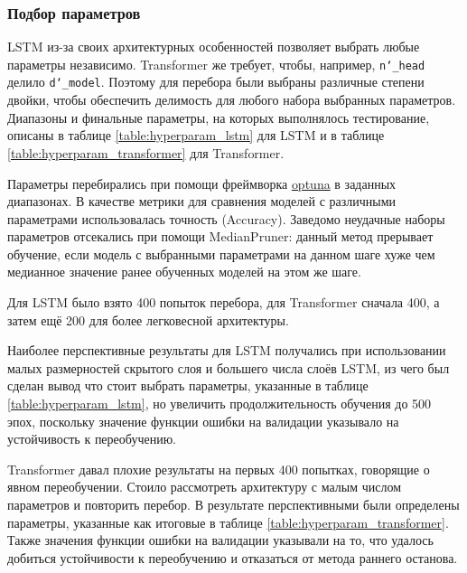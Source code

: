 \documentclass[diploma]{nanolab2015}
\begin{document}
\subsubsection{Подбор параметров}
LSTM из-за своих архитектурных особенностей позволяет выбрать любые параметры независимо. Transformer же требует, чтобы, например, \texttt{n\char`_head} делило \texttt{d\char`_model}. Поэтому для перебора были выбраны различные степени двойки, чтобы обеспечить делимость для любого набора выбранных параметров. Диапазоны и финальные параметры, на которых выполнялось тестирование, описаны в таблице \ref{table:hyperparam_lstm} для LSTM и в таблице \ref{table:hyperparam_transformer} для Transformer.

Параметры перебирались при помощи фреймворка \href{https://optuna.org/}{optuna} в заданных диапазонах. В качестве метрики для сравнения моделей с различными параметрами использовалась точность (Accuracy). Заведомо неудачные наборы параметров отсекались при помощи MedianPruner: данный метод прерывает обучение, если модель с выбранными параметрами на данном шаге хуже чем медианное значение ранее обученных моделей на этом же шаге.

Для LSTM было взято 400 попыток перебора, для Transformer сначала 400, а затем ещё 200 для более легковесной архитектуры.

Наиболее перспективные результаты для LSTM получались при использовании малых размерностей скрытого слоя и большего числа слоёв LSTM, из чего был сделан вывод что стоит выбрать параметры, указанные в таблице \ref{table:hyperparam_lstm}, но увеличить продолжительность обучения до 500 эпох, поскольку значение функции ошибки на валидации указывало на устойчивость к переобучению.

Transformer давал плохие результаты на первых 400 попытках, говорящие о явном переобучении. Стоило рассмотреть архитектуру с малым числом параметров и повторить перебор. В результате перспективными были определены параметры, указанные как итоговые в таблице \ref{table:hyperparam_transformer}. Также значения функции ошибки на валидации указывали на то, что удалось добиться устойчивости к переобучению и отказаться от метода раннего останова.

\end{document}
